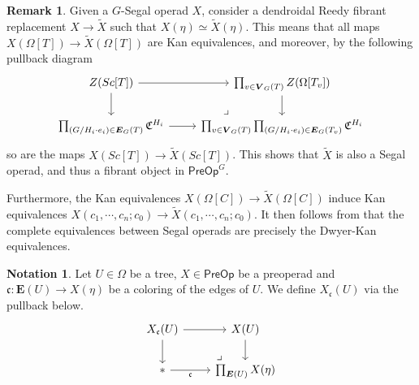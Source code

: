 \documentclass[a4paper,10pt
,draft
]{article}%
\numberwithin{equation}{section}
\numberwithin{figure}{section}
\theoremstyle{definition} %
\newtheorem{remark}[equation]{Remark}%
\newtheorem{notation}[equation]{Notation}%
\newcommand{\1}{\ensuremath{\mathbbm 1}}%
\begin{document}
\begin{remark}\label{SEOPDK REM}
Given a $G$-Segal operad $X$, consider a dendroidal Reedy fibrant replacement $X \to \tilde{X}$ such that $X(\eta) \simeq \tilde{X}(\eta)$. 
This means that all maps 
$X(\Omega[T]) \to \tilde{X}(\Omega[T])$ are Kan equivalences,
and moreover, by the following pullback diagram
\[
\begin{tikzcd}
	Z (Sc[T]) \ar{r} \ar{d} &
	\prod_{v \in \boldsymbol{V}_G(T)} Z
	(\Omega[T_v]) \ar{d}
\\
	\prod_{(G/H_i \cdot e_i) \in \boldsymbol{E}_G(T)} 
	\mathfrak{C}^{H_i} \ar{r}  &
	\prod_{v \in \boldsymbol{V}_G(T)}
	\prod_{(G/H_i \cdot e_i) \in \boldsymbol{E}_G(T_v)} 
	\mathfrak{C}^{H_i} 
	\arrow[ul, phantom, "\lrcorner", very near start]
\end{tikzcd}
\]
so are the maps $X(Sc[T]) \to \tilde{X}(Sc[T])$.
This shows that $\tilde{X}$ is also a Segal operad, 
and thus a fibrant object in $\mathsf{PreOp}^G$.

Furthermore, the Kan equivalences 
$X(\Omega[C]) \to \tilde{X}(\Omega[C])$
induce Kan equivalences 
$X(c_1,\cdots,c_n;c_0) \to \tilde{X}(c_1,\cdots,c_n;c_0)$.
It then follows from \cite[Thm. 5.48, Cor. 5.51]{BP_edss} that the complete equivalences between Segal operads are precisely the Dwyer-Kan equivalences.
\end{remark}





\begin{notation}
	Let $U \in \Omega$ be a tree, $X \in \mathsf{PreOp}$
	be a preoperad and
	$\mathfrak{c} \colon \boldsymbol{E}(U) \to X(\eta)$
	be a coloring of the edges of $U$.
	We define $X_{\mathfrak{c}}(U)$ via the pullback below.	
\begin{equation}\label{XUDEC EQ}
\begin{tikzcd}
	X_{\mathfrak{c}}(U) \ar{r} \ar{d}
&
	X(U) \ar{d}
\\
	\** \ar{r}[swap]{\mathfrak{c}} 
&
	\prod_{\boldsymbol{E}(U)} X(\eta)
	\arrow[lu, phantom, "\lrcorner", very near start]
\end{tikzcd}
\end{equation}	
\end{notation}
\end{document}
